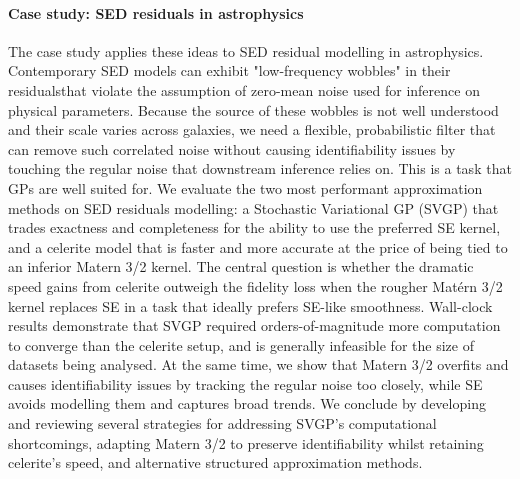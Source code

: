 \paragraph{Case study: SED residuals in astrophysics}
The case study applies these ideas to SED residual modelling in astrophysics. Contemporary SED models can exhibit "low-frequency wobbles" in their residualsthat violate the assumption of zero-mean noise used for inference on physical parameters. Because the source of these wobbles is not well understood and their scale varies across galaxies, we need a flexible, probabilistic filter that can remove such correlated noise without causing identifiability issues by touching the regular noise that downstream inference relies on. This is a task that GPs are well suited for. We evaluate the two most performant approximation methods on SED residuals modelling: a Stochastic Variational GP (SVGP) that trades exactness and completeness for the ability to use the preferred SE kernel, and a celerite model that is faster and more accurate at the price of being tied to an inferior Matern 3/2 kernel. The central question is whether the dramatic speed gains from celerite outweigh the fidelity loss when the rougher Matérn 3/2 kernel replaces SE in a task that ideally prefers SE-like smoothness. Wall-clock results demonstrate that SVGP required orders-of-magnitude more computation to converge than the celerite setup, and is generally infeasible for the size of datasets being analysed. At the same time, we show that Matern 3/2 overfits and causes identifiability issues by tracking the regular noise too closely, while SE avoids modelling them and captures broad trends. We conclude by developing and reviewing several strategies for addressing SVGP's computational shortcomings, adapting Matern 3/2 to preserve identifiability whilst retaining celerite's speed, and alternative structured approximation methods.
